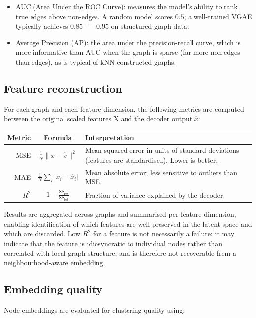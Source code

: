 \documentclass[11pt]{article}
\begin{document}
\begin{itemize}
\item AUC (Area Under the ROC Curve): measures the model's ability to
  rank true edges above non-edges. A random model scores $0.5$; a
  well-trained VGAE typically achieves $0.85--0.95$ on structured
  graph data.
\item Average Precision (AP): the area under the
  precision-recall curve, which is more informative than AUC when
  the graph is sparse (far more non-edges than edges), as is
  typical of kNN-constructed graphs.
\end{itemize}


\subsection{Feature reconstruction}
For each graph and each feature dimension, the following metrics are
computed between the original scaled features X and the decoder
output $\hat{x}$:

\begin{table}[H]
\centering
\begin{tabular}{ r c p{} }
Metric & Formula & Interpretation \\
\hline
MSE
& $\frac{1}{N} \lVert x - \hat{x} \rVert^2$
& Mean squared error in units of standard deviations (features are
standardised). Lower is better. \\
MAE
& $\frac{1}{N} \sum_i \lvert x_i - \hat{x}_i \rvert$
& Mean absolute error; less sensitive to outliers than MSE. \\
$R^2$
& $1 - \frac{\text{SS}_{\text{res}}}{\text{SS}_{\text{tot}}}$
& Fraction of variance explained by the decoder.
\end{tabular}
\end{table}

Results are aggregated across graphs and summarised per feature
dimension, enabling identification of which features are
well-preserved in the latent space and which are discarded. Low $R^2$
for a feature is not necessarily a failure: it may indicate that the
feature is idiosyncratic to individual nodes rather than correlated
with local graph structure, and is therefore not recoverable from a
neighbourhood-aware embedding.


\subsection{Embedding quality}
Node embeddings are evaluated for clustering quality using:
\end{document}
